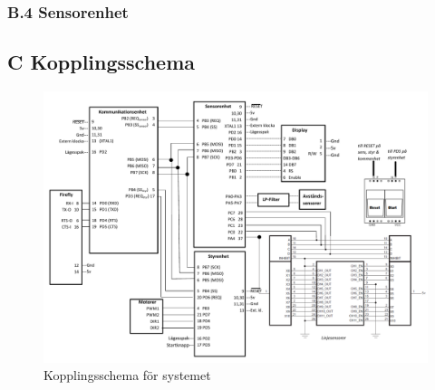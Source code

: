 \subsubsection*{B.4 \hspace*{1em} Sensorenhet}



















\subsection*{C \hspace*{1em} Kopplingsschema}
\begin{figure}[H]
 \centering
 \includegraphics[angle=270,scale=0.75]{bilder/kopplingsschema.pdf}
  \caption{Kopplingsschema för systemet}
\end{figure}
